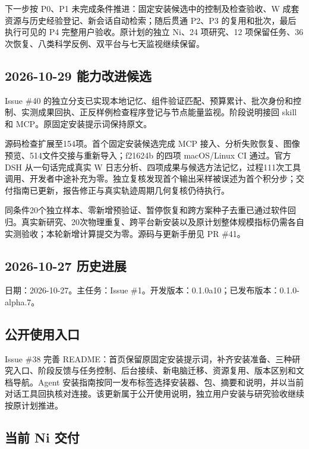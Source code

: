 \documentclass[11pt,a4paper]{ctexart}
\begin{document}
下一步按 P0、P1 未完成条件推进：固定安装候选中的控制及检查验收、W 成套资源与历史经验登记、新会话自动检索；随后贯通 P2、P3 的复用和批次，最后执行可见的 P4 完整用户验收。原计划的独立 Ni、24 项研究、12 项保留任务、36 次恢复、八类科学反例、双平台与七天监视继续保留。



\subsection{2026-10-29 能力改进候选}


Issue \#40 的独立分支已实现本地记忆、组件验证匹配、预算累计、批次身份和控制、实测成果回执、正反样例检查程序登记与节点能量监视。阶段说明接回 skill 和 MCP。原固定安装提示词保持原文。



源码检查扩展至154项。首个固定安装候选完成 MCP 接入、分析失败恢复、图像预览、514文件交接与重新导入；f21624b 的四项 macOS/\allowbreak{}Linux CI 通过。官方 DSH 从一句话完成真实 W 日志分析、四项成果与候选方法记忆，过程111次工具调用、开发者中途补充为零。独立复核发现首个输出采样被误述为首个积分步；交付指南已更新，报告修正与真实轨迹周期几何复核仍待执行。



同条件20个独立样本、零新增预验证、暂停恢复和跨方案种子去重已通过软件回归。真实新研究、20次物理重复、跨平台新安装以及原计划整体规模指标仍需各自实测验收；本轮新增计算提交为零。源码与更新手册见 PR \#41。



\subsection{2026-10-27 历史进展}


日期：2026-10-27。主任务：Issue \#1。开发版本：0.1.0a10；已发布版本：0.1.0-alpha.7。



\subsection{公开使用入口}


Issue \#38 完善 README：首页保留原固定安装提示词，补齐安装准备、三种研究入口、阶段反馈与任务控制、后台接续、新电脑迁移、资源复用、版本区别和文档导航。Agent 安装指南按同一发布标签选择安装器、包、摘要和说明，并以当前对话工具回执核对连接。该更新属于公开使用说明，独立用户安装与研究验收继续按原计划推进。



\subsection{当前 Ni 交付}
\end{document}
